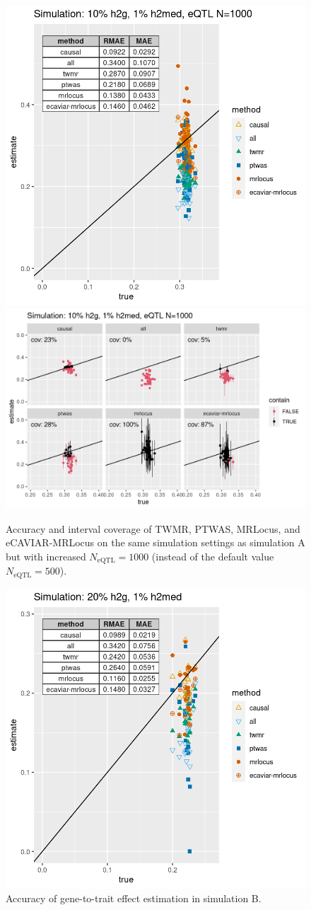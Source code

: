 \documentclass[11pt]{article}
\begin{document}
\begin{figure}[!ht]
  \centering
  \includegraphics[width=.33\textwidth]{figs/simhigh_n.png}
  \includegraphics[width=.5\textwidth]{figs/coverhigh_n.png}
  \caption{Accuracy and interval coverage of TWMR, PTWAS, MRLocus, and
  eCAVIAR-MRLocus on the same simulation settings as simulation A but
  with increased $N_{\textrm{eQTL}} = 1000$ (instead of the default
  value $N_{\textrm{eQTL}} = 500$).}
\end{figure}

\begin{figure}[!ht]
  \centering
  \includegraphics[width=.6\textwidth]{figs/sim3.png}
  \caption{Accuracy of gene-to-trait effect estimation in simulation B.}
\end{figure}
\end{document}
